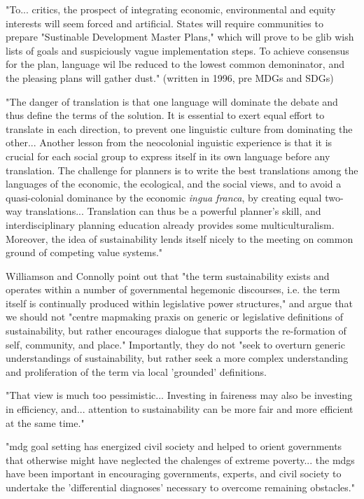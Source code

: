 "To... critics, the prospect of integrating economic, environmental and equity interests will seem forced and artificial. States will require communities to prepare "Sustinable Development Master Plans," which will prove to be glib wish lists of goals and suspiciously vague implementation steps. To achieve consensus for the plan, language wil lbe reduced to the lowest common demoninator, and the pleasing plans will gather dust." (written in 1996, pre MDGs and SDGs) \cite{campbellGreenCitiesGrowing2016}

"The danger of translation is that one language will dominate the debate and thus define the terms of the solution. It is essential to exert equal effort to translate in each direction, to prevent one linguistic culture from dominating the other... Another lesson from the neocolonial inguistic experience is that it is crucial for each social group to express itself in its own language before any translation. The challenge for planners is to write the best translations among the languages of the economic, the ecological, and the social views, and to avoid a quasi-colonial dominance by the economic \textit{ingua franca}, by creating equal two-way translations... Translation can thus be a powerful planner's skill, and interdisciplinary planning education already provides some multiculturalism. Moreover, the idea of sustainability lends itself nicely to the meeting on common ground of competing value systems." \cite{campbellGreenCitiesGrowing2016}

Williamson and Connolly point out that "the term sustainability exists and operates within a number of governmental hegemonic discourses, i.e. the term itself is continually produced within legislative power structures," and argue that we should not "centre mapmaking praxis on generic or legislative definitions of sustainability, but rather encourages dialogue that supports the re-formation of self, community, and place." Importantly, they do not "seek to overturn generic understandings of sustainability, but rather seek a more complex understanding and proliferation of the term via local 'grounded' definitions. \cite{williamsonTheirworkDevelopmentSustainable2011} 


"That view is much too pessimistic... Investing in faireness may also be investing in efficiency, and... attention to sustainability can be more fair and more efficient at the same time." \cite{sachsAgeSustainableDevelopment2015}

"\ac{mdg} goal setting has energized civil society and helped to orient governments that otherwise might have neglected the chalenges of extreme poverty... the \acp{mdg} have been important in encouraging governments, experts, and civil society to undertake the 'differential diagnoses' necessary to overcome remaining obstacles." \cite{sachsAgeSustainableDevelopment2015}

